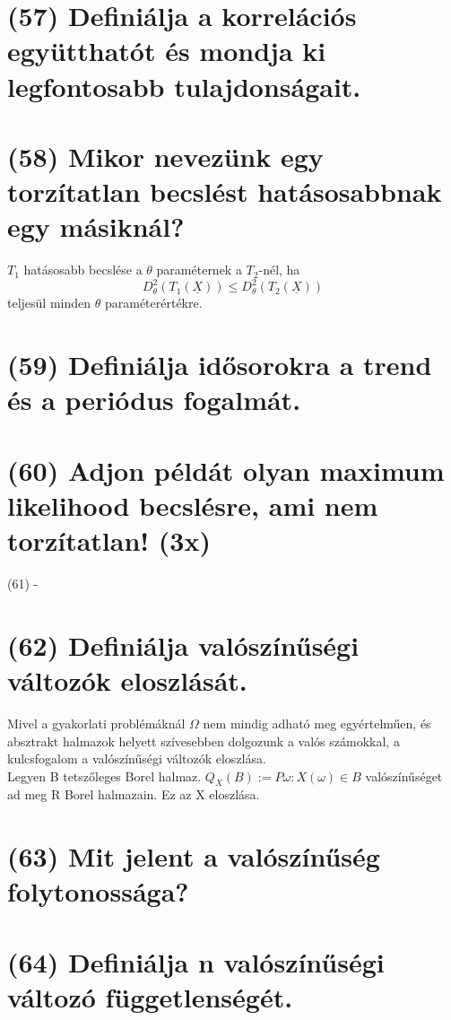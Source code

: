 \documentclass[12p]{article}
\begin{document}
\section{(57) Definiálja a korrelációs együtthatót és mondja ki legfontosabb tulajdonságait.}

\section{(58) Mikor nevezünk egy torzítatlan becslést hatásosabbnak egy másiknál?}

$T_1$ hatásosabb becslése a $\theta$ paraméternek a $T_2$-nél, ha
$$D_{\theta}^2(T_1(\underline{X})) \leq D_{\theta}^2(T_2(\underline{X}))$$
teljesül minden $\theta$ paraméterértékre.

\section{(59) Definiálja idősorokra a trend és a periódus fogalmát.}

\section{(60) Adjon példát olyan maximum likelihood becslésre, ami nem torzítatlan! (3x)}

(61) -

\section{(62) Definiálja valószínűségi változók eloszlását.}

Mivel a gyakorlati problémáknál $\Omega$ nem
mindig adható meg egyértelműen, és
absztrakt halmazok helyett szívesebben
dolgozunk a valós számokkal, a kulcsfogalom
a valószínűségi változók eloszlása.\\
Legyen B tetszőleges Borel halmaz.
$Q_X(B):= P{\omega: X(\omega) \in B}$ valószínűséget ad
meg R Borel halmazain. Ez az X eloszlása.\\

\section{(63) Mit jelent a valószínűség folytonossága?}

\section{(64) Definiálja n valószínűségi változó függetlenségét.}
\end{document}
